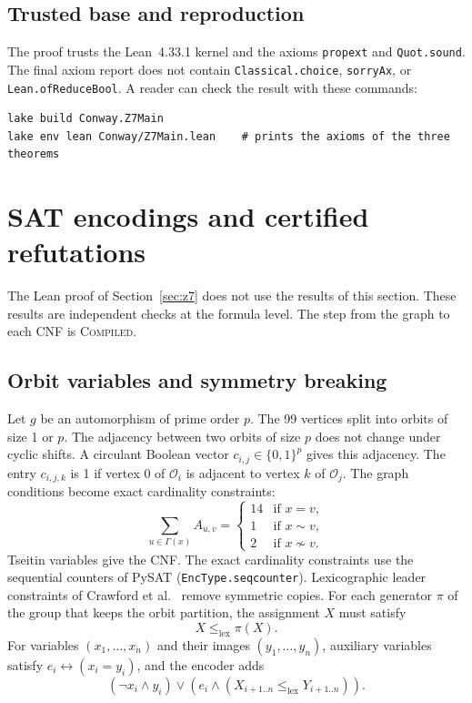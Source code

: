 \documentclass{article}
\theoremstyle{plain}
\theoremstyle{definition}
\numberwithin{equation}{section}
\begin{document}
\subsection{Trusted base and reproduction}

The proof trusts the Lean~4.33.1 kernel and the axioms \texttt{propext} and \texttt{Quot.sound}. The final axiom report does not contain \texttt{Classical.choice}, \texttt{sorryAx}, or \texttt{Lean.ofReduceBool}. A reader can check the result with these commands:
\begin{lstlisting}
lake build Conway.Z7Main
lake env lean Conway/Z7Main.lean    # prints the axioms of the three theorems
\end{lstlisting}

\section{SAT encodings and certified refutations}
\label{sec:sat}

The Lean proof of Section~\ref{sec:z7} does not use the results of this section. These results are independent checks at the formula level. The step from the graph to each CNF is \textsc{Compiled}.

\subsection{Orbit variables and symmetry breaking}

Let $g$ be an automorphism of prime order $p$. The 99 vertices split into orbits of size 1 or $p$. The adjacency between two orbits of size $p$ does not change under cyclic shifts. A circulant Boolean vector $c_{i,j} \in \{0,1\}^p$ gives this adjacency. The entry $c_{i,j,k}$ is 1 if vertex 0 of $\mathcal{O}_i$ is adjacent to vertex $k$ of $\mathcal{O}_j$.
The graph conditions become exact cardinality constraints:
\begin{equation}
 \sum_{u \in \Gamma(x)} A_{u,v} =
 \begin{cases}
  14 & \text{if } x = v, \\
  1 & \text{if } x \sim v, \\
  2 & \text{if } x \not\sim v.
 \end{cases}
\end{equation}
Tseitin variables give the CNF. The exact cardinality constraints use the sequential counters of PySAT (\texttt{EncType.seqcounter}).
Lexicographic leader constraints of Crawford et al.~\cite{crawford1996symmetry} remove symmetric copies. For each generator $\pi$ of the group that keeps the orbit partition, the assignment $X$ must satisfy
\begin{equation}
 X \le_{\text{lex}} \pi(X).
 \label{eq:lex_leader}
\end{equation}
For variables $(x_1, \dots, x_n)$ and their images $(y_1, \dots, y_n)$, auxiliary variables satisfy $e_i \leftrightarrow (x_i = y_i)$, and the encoder adds
\begin{equation}
 (\neg x_i \land y_i) \lor (e_i \land (X_{i+1..n} \le_{\text{lex}} Y_{i+1..n})).
\end{equation}
\end{document}
